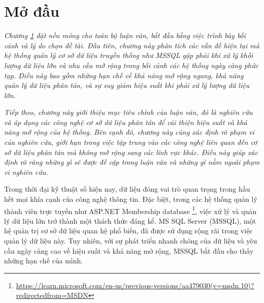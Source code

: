 \documentclass{extreport}[13.5pt, oneside,a4paper]
\begin{document}




















%

\section{Mở đầu}
\label{sec:introduction}

\textit{Chương \ref{sec:introduction} đặt nền móng cho toàn bộ luận văn, bắt đầu bằng việc trình bày bối cảnh và lý do chọn đề tài. Đầu tiên, chương này phân tích các vấn đề hiện tại mà hệ thống quản lý cơ sở dữ liệu truyền thống như MSSQL gặp phải khi xử lý khối lượng dữ liệu lớn và nhu cầu mở rộng trong bối cảnh các hệ thống ngày càng phức tạp. Điều này bao gồm những hạn chế về khả năng mở rộng ngang, khả năng quản lý dữ liệu phân tán, và sự suy giảm hiệu suất khi phải xử lý lượng dữ liệu lớn.}

\textit{Tiếp theo, chương này giới thiệu mục tiêu chính của luận văn, đó là nghiên cứu và áp dụng các công nghệ cơ sở dữ liệu phân tán để cải thiện hiệu suất và khả năng mở rộng của hệ thống. Bên cạnh đó, chương này cũng xác định rõ phạm vi của nghiên cứu, giới hạn trong việc tập trung vào các công nghệ liên quan đến cơ sở dữ liệu phân tán mà không mở rộng sang các lĩnh vực khác. Điều này giúp xác định rõ ràng những gì sẽ được đề cập trong luận văn và những gì nằm ngoài phạm vi nghiên cứu.}


Trong thời đại kỹ thuật số hiện nay, dữ liệu đóng vai trò quan trọng trong hầu hết mọi khía cạnh của công nghệ thông tin. Đặc biệt, trong các hệ thống quản lý thành viên trực tuyến như ASP.NET Membership database \footnote{\url{https://learn.microsoft.com/en-us/previous-versions/aa479030(v=msdn.10)?redirectedfrom=MSDN}}, việc xử lý và quản lý dữ liệu lớn trở thành một thách thức đáng kể. MS SQL Server (MSSQL), một hệ quản trị cơ sở dữ liệu quan hệ phổ biến, đã được sử dụng rộng rãi trong việc quản lý dữ liệu này. Tuy nhiên, với sự phát triển nhanh chóng của dữ liệu và yêu cầu ngày càng cao về hiệu suất và khả năng mở rộng, MSSQL bắt đầu cho thấy những hạn chế của mình.
\end{document}
